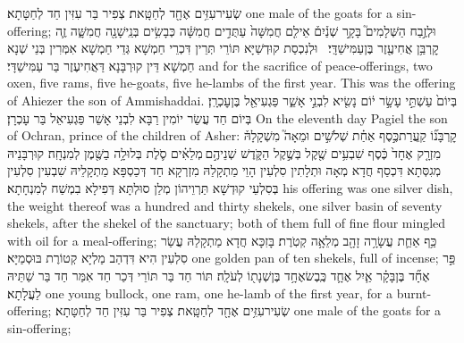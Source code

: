 {שְׂעִיר\maqqaf עִזִּ֥ים אֶחָ֖ד לְחַטָּֽאת׃}
{צְפִיר בַּר עִזִּין חַד לְחַטָּתָא׃}
{one male of the goats for a sin-offering;}{}
{וּלְזֶ֣בַח הַשְּׁלָמִים֮ בָּקָ֣ר שְׁנַ֒יִם֒ אֵילִ֤ם חֲמִשָּׁה֙ עַתֻּדִ֣ים חֲמִשָּׁ֔ה כְּבָשִׂ֥ים בְּנֵֽי\maqqaf שָׁנָ֖ה חֲמִשָּׁ֑ה זֶ֛ה קׇרְבַּ֥ן אֲחִיעֶ֖זֶר בֶּן\maqqaf עַמִּישַׁדָּֽי׃ \petucha }
{וּלְנִכְסַת קוּדְשַׁיָּא תּוֹרֵי תְּרֵין דִּכְרֵי חַמְשָׁא גְּדֵי חַמְשָׁא אִמְּרִין בְּנֵי שְׁנָא חַמְשָׁא דֵּין קוּרְבָּנָא דַּאֲחִיעֶזֶר בַּר עַמִּישַׁדָּי׃}
{and for the sacrifice of peace-offerings, two oxen, five rams, five he-goats, five he-lambs of the first year. This was the offering of Ahiezer the son of Ammishaddai.}{}
{בְּיוֹם֙ עַשְׁתֵּ֣י עָשָׂ֣ר י֔וֹם נָשִׂ֖יא לִבְנֵ֣י אָשֵׁ֑ר פַּגְעִיאֵ֖ל בֶּן\maqqaf עׇכְרָֽן׃}
{בְּיוֹם חַד עֲשַׂר יוֹמִין רַבָּא לִבְנֵי אָשֵׁר פַּגְעִיאֵל בַּר עָכְרָן׃}
{On the eleventh day Pagiel the son of Ochran, prince of the children of Asher:}{}
{קׇרְבָּנ֞וֹ קַֽעֲרַת\maqqaf כֶּ֣סֶף אַחַ֗ת שְׁלֹשִׁ֣ים וּמֵאָה֮ מִשְׁקָלָהּ֒ מִזְרָ֤ק אֶחָד֙ כֶּ֔סֶף שִׁבְעִ֥ים שֶׁ֖קֶל בְּשֶׁ֣קֶל הַקֹּ֑דֶשׁ שְׁנֵיהֶ֣ם \legarmeh  מְלֵאִ֗ים סֹ֛לֶת בְּלוּלָ֥ה בַשֶּׁ֖מֶן לְמִנְחָֽה׃}
{קוּרְבָּנֵיהּ מְגִסְּתָא דִּכְסַף חֲדָא מְאָה וּתְלָתִין סִלְעִין הָוֵי מַתְקָלַהּ מִזְרְקָא חַד דְּכַסְפָּא מַתְקָלֵיהּ שִׁבְעִין סִלְעִין בְּסִלְעֵי קוּדְשָׁא תַּרְוֵיהוֹן מְלַן סוּלְתָּא דְּפִילָא בִמְשַׁח לְמִנְחָתָא׃}
{his offering was one silver dish, the weight thereof was a hundred and thirty shekels, one silver basin of seventy shekels, after the shekel of the sanctuary; both of them full of fine flour mingled with oil for a meal-offering;}{}
{כַּ֥ף אַחַ֛ת עֲשָׂרָ֥ה זָהָ֖ב מְלֵאָ֥ה קְטֹֽרֶת׃}
{בָּזִכָּא חֲדָא מַתְקָלַהּ עֲשַׂר סִלְעִין הִיא דִּדְהַב מַלְיָא קְטוֹרֶת בּוּסְמַיָּא׃}
{one golden pan of ten shekels, full of incense;}{}
{פַּ֣ר אֶחָ֞ד בֶּן\maqqaf בָּקָ֗ר אַ֧יִל אֶחָ֛ד כֶּֽבֶשׂ\maqqaf אֶחָ֥ד בֶּן\maqqaf שְׁנָת֖וֹ לְעֹלָֽה׃}
{תּוֹר חַד בַּר תּוֹרֵי דְּכַר חַד אִמַּר חַד בַּר שַׁתֵּיהּ לַעֲלָתָא׃}
{one young bullock, one ram, one he-lamb of the first year, for a burnt-offering;}{}
{שְׂעִיר\maqqaf עִזִּ֥ים אֶחָ֖ד לְחַטָּֽאת׃}
{צְפִיר בַּר עִזִּין חַד לְחַטָּתָא׃}
{one male of the goats for a sin-offering;}{}
